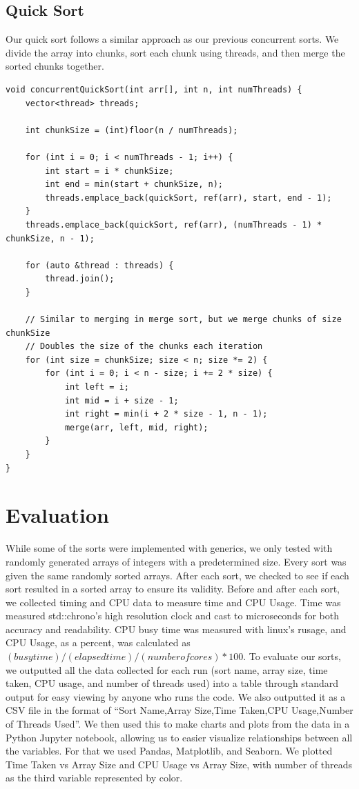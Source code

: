 \documentclass[conference]{IEEEtran}
\begin{document}
\subsection{Quick Sort}
Our quick sort follows a similar approach as our previous concurrent sorts. We divide the array into chunks, sort each chunk using threads, and then merge the sorted chunks together.
\\
\begin{lstlisting}
void concurrentQuickSort(int arr[], int n, int numThreads) {
    vector<thread> threads;

    int chunkSize = (int)floor(n / numThreads);

    for (int i = 0; i < numThreads - 1; i++) {
        int start = i * chunkSize;
        int end = min(start + chunkSize, n);
        threads.emplace_back(quickSort, ref(arr), start, end - 1);
    }
    threads.emplace_back(quickSort, ref(arr), (numThreads - 1) * chunkSize, n - 1);
    
    for (auto &thread : threads) {
        thread.join();
    }

    // Similar to merging in merge sort, but we merge chunks of size chunkSize
    // Doubles the size of the chunks each iteration
    for (int size = chunkSize; size < n; size *= 2) {
        for (int i = 0; i < n - size; i += 2 * size) {
            int left = i;
            int mid = i + size - 1;
            int right = min(i + 2 * size - 1, n - 1);
            merge(arr, left, mid, right);
        }
    }
}
\end{lstlisting}

\section{Evaluation}
While some of the sorts were implemented with generics, we only tested with randomly generated arrays of integers with a predetermined size. Every sort was given the same randomly sorted arrays. After each sort, we checked to see if each sort resulted in a sorted array to ensure its validity. Before and after each sort, we collected timing and CPU data to measure time and CPU Usage. Time was measured std::chrono's high resolution clock and cast to microseconds for both accuracy and readability. CPU busy time was measured with linux's rusage, and CPU Usage, as a percent, was calculated as $(busy time) / (elapsed time) / (number of cores) * 100$. To evaluate our sorts, we outputted all the data collected for each run (sort name, array size, time taken, CPU usage, and number of threads used) into a table through standard output for easy viewing by anyone who runs the code. We also outputted it as a CSV file in the format of “Sort Name,Array Size,Time Taken,CPU Usage,Number of Threads Used”. We then used this to make charts and plots from the data in a Python Jupyter notebook, allowing us to easier visualize relationships between all the variables. For that we used Pandas, Matplotlib, and Seaborn. We plotted Time Taken vs Array Size and CPU Usage vs Array Size, with number of threads as the third variable represented by color.
\end{document}
